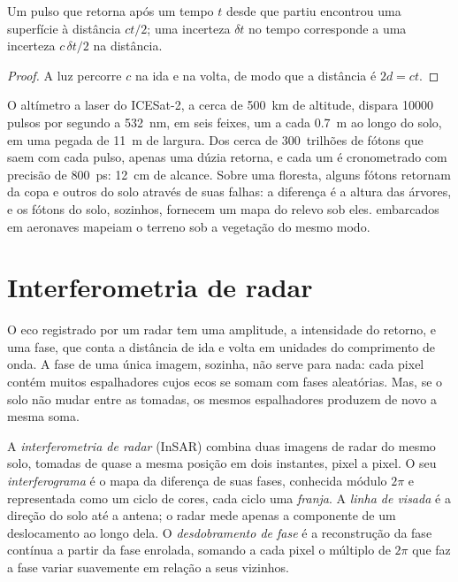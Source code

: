 \begin{proposition}\label{prop:b3:remote-sensing-gis:tof}
Um pulso que retorna após um tempo $t$ desde que partiu encontrou uma superfície à
distância $ct/2$; uma incerteza $\delta t$ no tempo corresponde a uma incerteza
$c\,\delta t/2$ na distância.
\end{proposition}

\begin{proof}
A luz percorre $c$ na ida e na volta, de modo que a distância é $2d = ct$.
\end{proof}

O altímetro a laser do ICESat-2, a cerca de \qty{500}{km} de altitude, dispara
\num{10000} pulsos por segundo a \qty{532}{nm}, em seis feixes, um a cada
\qty{0.7}{m} ao longo do solo, em uma pegada de \qty{11}{m} de largura. Dos
cerca de 300~trilhões de fótons que saem com cada pulso, apenas uma dúzia
retorna, e cada um é cronometrado com precisão de \qty{800}{ps}: \qty{12}{cm} de alcance. Sobre uma
floresta, alguns fótons retornam da copa e outros do solo
através de suas falhas: a diferença é a altura das árvores, e os
fótons do solo, sozinhos, fornecem um mapa do relevo sob eles.  embarcados em
aeronaves mapeiam o terreno sob a vegetação do mesmo modo.

\section{Interferometria de radar}\label{sec:b3:remote-sensing-gis:insar}

O eco registrado por um radar tem uma amplitude, a intensidade do retorno,
e uma fase, que conta a distância de ida e volta em unidades do
comprimento de onda. A fase de uma única imagem, sozinha, não serve para nada: cada pixel contém muitos
espalhadores cujos ecos se somam com fases aleatórias. Mas, se o solo não
mudar entre as tomadas, os mesmos espalhadores produzem de novo a mesma soma.

\begin{definition}\label{def:b3:remote-sensing-gis:insar}
A \emph{interferometria de radar} (InSAR) combina
duas imagens de radar do mesmo solo, tomadas de quase a mesma posição
em dois instantes, pixel a pixel. O seu \emph{interferograma}
é o mapa da diferença de suas fases, conhecida módulo $2\pi$ e
representada como um ciclo de cores, cada ciclo uma \emph{franja}. A \emph{linha de
visada} é a direção do solo até
a antena; o radar mede apenas a componente de um deslocamento ao longo
dela. O \emph{desdobramento de fase} é a reconstrução
da fase contínua a partir da fase enrolada, somando a cada pixel o
múltiplo de $2\pi$ que faz a fase variar suavemente em relação a seus vizinhos.
\end{definition}

